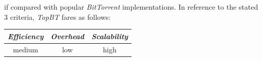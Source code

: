 if compared with popular {\sl BitTorrent} implementations.
In reference to the stated $3$ criteria, \emph{TopBT} fares as follows:
\begin{center}
{\footnotesize
\begin{tabular}{ccc}
\emph{Efficiency} & \emph{Overhead} & \emph{Scalability} \\
\hline
medium &
low &
high
\end{tabular}
}
\end{center}

